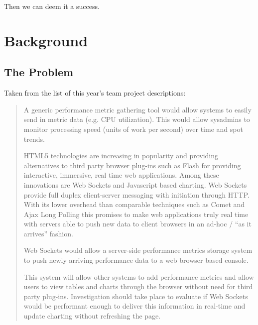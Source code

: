 \documentclass{l3proj}
\begin{document}
Then we can deem it a success.



\chapter{Background}
\label{background}

\section{The Problem}
\label{section:problem}


Taken from the list of this year's team project descriptions:

\begin{quotation}
A generic performance metric gathering tool would allow systems to easily send in metric data (e.g. CPU utilization). This would allow sysadmins to monitor processing speed (units of work per second) over time and spot trends.

HTML5 technologies are increasing in popularity and providing alternatives to third party browser plug-ins such as Flash for providing interactive, immersive, real time web applications. Among these innovations are Web Sockets and Javascript based charting.
Web Sockets provide full duplex client-server messaging with initiation through HTTP. With its lower overhead than comparable techniques such as Comet and Ajax Long Polling this promises to make web applications truly real time with servers able to push new data to client browsers in an ad-hoc / ``as it arrives'' fashion.

Web Sockets would allow a server-side performance metrics storage system to push newly arriving performance data to a web browser based console.

This system will allow other systems to add performance metrics and allow users to view tables and charts through the browser without need for third party plug-ins. Investigation should take place to evaluate if Web Sockets would be performant enough to deliver this information in real-time and update charting without refreshing the page.
\end{quotation}
\end{document}
